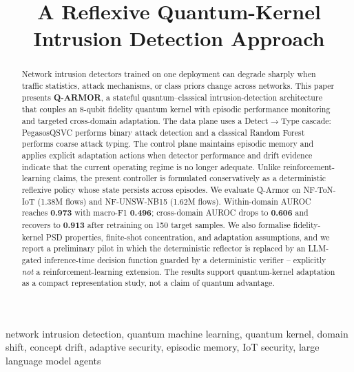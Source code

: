 \documentclass[conference]{IEEEtran}
\begin{document}
\title{A Reflexive Quantum-Kernel Intrusion Detection Approach}

\author{
\and
{}
}

\maketitle

\begin{abstract}
Network intrusion detectors trained on one deployment can degrade sharply
when traffic statistics, attack mechanisms, or class priors change across
networks. This paper presents \textbf{Q-ARMOR}, a stateful
quantum--classical intrusion-detection architecture that couples an
8-qubit fidelity quantum kernel with episodic performance monitoring and
targeted cross-domain adaptation. The data plane uses a
Detect$\to$Type cascade: PegasosQSVC performs binary attack detection and
a classical Random Forest performs coarse attack typing. The control plane
maintains episodic memory and applies explicit adaptation actions when
detector performance and drift evidence indicate that the current
operating regime is no longer adequate. Unlike reinforcement-learning
claims, the present controller is formulated conservatively as a
deterministic reflexive policy whose state persists across episodes. We
evaluate Q-Armor on NF-ToN-IoT (1.38M flows) and NF-UNSW-NB15 (1.62M
flows). Within-domain AUROC reaches \textbf{0.973} with macro-F1
\textbf{0.496}; cross-domain AUROC drops to \textbf{0.606} and recovers to
\textbf{0.913} after retraining on 150 target samples. We also formalise
fidelity-kernel PSD properties, finite-shot concentration, and adaptation
assumptions, and we report a preliminary pilot in which the deterministic
reflector is replaced by an LLM-gated inference-time decision function
guarded by a deterministic verifier -- explicitly \emph{not} a
reinforcement-learning extension. The results support quantum-kernel
adaptation as a compact representation study, not a claim of quantum
advantage.
\end{abstract}

\begin{IEEEkeywords}
network intrusion detection, quantum machine learning, quantum kernel,
domain shift, concept drift, adaptive security, episodic memory, IoT
security, large language model agents
\end{IEEEkeywords}
\end{document}
